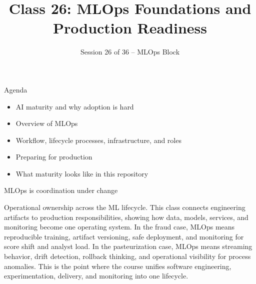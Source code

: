 

\title{Class 26: MLOps Foundations and Production Readiness}
\subtitle{Session 26 of 36 -- MLOps Block}
\author{\coursename}
\date{}



\frame{\titlepage \coursefooter}

\begin{frame}{Agenda}
\begin{itemize}
\item AI maturity and why adoption is hard
\item Overview of MLOps
\item Workflow, lifecycle processes, infrastructure, and roles
\item Preparing for production
\item What maturity looks like in this repository
\end{itemize}
\coursefooter
\end{frame}

\begin{frame}{MLOps is coordination under change}
\coursefooter
\end{frame}

\coursecontextframe
{Operational ownership across the ML lifecycle.}
{This class connects engineering artifacts to production responsibilities, showing how data, models, services, and monitoring become one operating system.}
{In the fraud case, MLOps means reproducible training, artifact versioning, safe deployment, and monitoring for score shift and analyst load.}
{In the pasteurization case, MLOps means streaming behavior, drift detection, rollback thinking, and operational visibility for process anomalies.}
{This is the point where the course unifies software engineering, experimentation, delivery, and monitoring into one lifecycle.}

